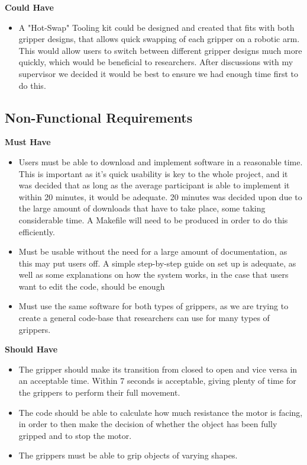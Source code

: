 \documentclass{l4proj}
\begin{document}
\textbf{Could Have}
\begin{itemize}
	\item A "Hot-Swap" Tooling kit could be designed and created that fits with both gripper designs, that allows quick swapping of each gripper on a robotic arm. This would allow users to switch between different gripper designs much more quickly, which would be beneficial to researchers. After discussions with my supervisor we decided it would be best to ensure we had enough time first to do this. 
\end{itemize}


\subsection{Non-Functional Requirements}

\textbf{Must Have}
\begin{itemize}
	\item Users must be able to download and implement software in a reasonable time. This is important as it's quick usability is key to the whole project, and it was decided that as long as the average participant is able to implement it within 20 minutes, it would be adequate. 20 minutes was decided upon due to the large amount of downloads that have to take place, some taking considerable time. A Makefile will need to be produced in order to do this efficiently. 
	\item Must be usable without the need for a large amount of documentation, as this may put users off. A simple step-by-step guide on set up is adequate, as well as some explanations on how the system works, in the case that users want to edit the code, should be enough
	\item Must use the same software for both types of grippers, as we are trying to create a general code-base that researchers can use for many types of grippers.
\end{itemize}

\textbf{Should Have}
\begin{itemize}
	\item The gripper should make its transition from closed to open and vice versa in an acceptable time. Within 7 seconds is acceptable, giving plenty of time for the grippers to perform their full movement. 
	\item The code should be able to calculate how much resistance the motor is facing, in order to then make the decision of whether the object has been fully gripped and to stop the motor. 
	\item The grippers must be able to grip objects of varying shapes.
\end{itemize}
\end{document}
